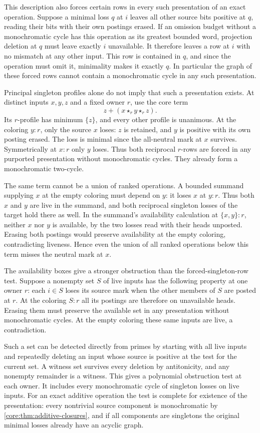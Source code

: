 This description also forces certain rows in every
such presentation of an exact operation. Suppose a
minimal loss $q$ at $i$ leaves all other source bits
positive at $q$, reading their bits with their own
postings erased. If an omission budget without a
monochromatic cycle has this operation as its greatest
bounded word, projection deletion at $q$ must leave
exactly $i$ unavailable. It therefore leaves a row
at $i$ with no mismatch at any other input. This row
is contained in $q$, and since the operation must
omit it, minimality makes it exactly $q$. In
particular the graph of these forced rows cannot
contain a monochromatic cycle in any such presentation.

Principal singleton profiles alone do not imply that
such a presentation exists. At distinct inputs $x,y,z$
and a fixed owner $r$, use the core term
\[
                 z+(x\star_r y\star_r z).
\]
Its $r$-profile has minimum $\{z\}$, and every other
profile is unanimous. At the coloring $y:r$, only
the source $x$ loses: $z$ is retained, and $y$ is
positive with its own posting erased. The loss is
minimal since the all-neutral mark at $x$ survives.
Symmetrically at $x:r$ only $y$ loses. Thus both
reciprocal $r$-rows are forced in any purported
presentation without monochromatic cycles. They
already form a monochromatic two-cycle.

The same term cannot be a union of ranked operations.
A bounded summand supplying $x$ at the empty coloring
must depend on $y$: it loses $x$ at $y:r$. Thus both
$x$ and $y$ are live in the summand, and both reciprocal
singleton losses of the target hold there as well.
In the summand's availability calculation at $\{x,y\}:r$,
neither $x$ nor $y$ is
available, by the two losses read with their heads
unposted. Erasing both postings would preserve
availability at the empty coloring, contradicting
liveness. Hence even the union of all ranked
operations below this term misses the neutral
mark at $x$.

The availability boxes give a stronger obstruction than
the forced-singleton-row test. Suppose a nonempty set $S$
of live inputs has the following property at one owner
$r$: each $i\in S$ loses its source mark when the other
members of $S$ are posted at $r$. At the coloring $S:r$
all its postings are therefore on unavailable heads.
Erasing them must preserve the available set in any
presentation without monochromatic cycles. At the empty
coloring these same inputs are live, a contradiction.

Such a set can be detected directly from primes by
starting with all live inputs and repeatedly deleting
an input whose source is positive at the test for the
current set. A witness set survives every deletion by
antitonicity, and any nonempty remainder is a witness.
This gives a polynomial obstruction test at each owner.
It includes every monochromatic cycle of singleton
losses on live inputs. For an exact additive operation
the test is complete for existence of the presentation:
every nontrivial source component is monochromatic by
\cref{core:thm:additive-closures}, and if all components
are singletons the original minimal losses already have
an acyclic graph.

